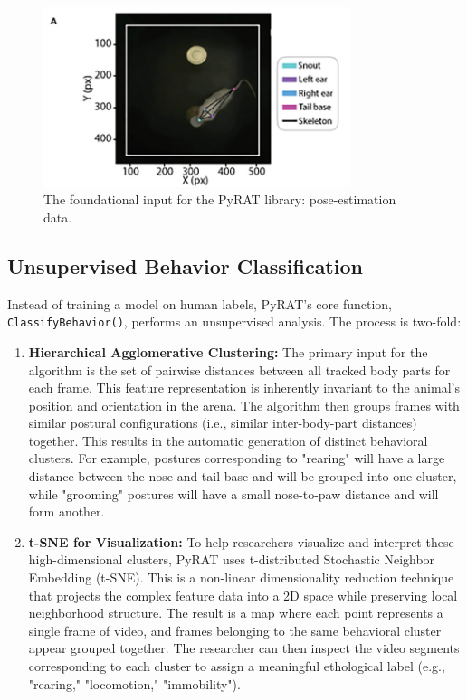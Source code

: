 \begin{figure}[H]
    \centering
    \includegraphics[width=0.8\textwidth]{archivos/figuras/pyrat_1a.jpg} 
    \caption{The foundational input for the PyRAT library: pose-estimation data.}
    \label{fig:pose_input}
\end{figure}

\subsection{Unsupervised Behavior Classification}
Instead of training a model on human labels, PyRAT's core function, \texttt{ClassifyBehavior()}, performs an unsupervised analysis. The process is two-fold:

\begin{enumerate}
    \item \textbf{Hierarchical Agglomerative Clustering:} The primary input for the algorithm is the set of pairwise distances between all tracked body parts for each frame. This feature representation is inherently invariant to the animal's position and orientation in the arena. The algorithm then groups frames with similar postural configurations (i.e., similar inter-body-part distances) together. This results in the automatic generation of distinct behavioral clusters. For example, postures corresponding to "rearing" will have a large distance between the nose and tail-base and will be grouped into one cluster, while "grooming" postures will have a small nose-to-paw distance and will form another.

    \item \textbf{t-SNE for Visualization:} To help researchers visualize and interpret these high-dimensional clusters, PyRAT uses t-distributed Stochastic Neighbor Embedding (t-SNE). This is a non-linear dimensionality reduction technique that projects the complex feature data into a 2D space while preserving local neighborhood structure. The result is a map where each point represents a single frame of video, and frames belonging to the same behavioral cluster appear grouped together. The researcher can then inspect the video segments corresponding to each cluster to assign a meaningful ethological label (e.g., "rearing," "locomotion," "immobility").
\end{enumerate}

